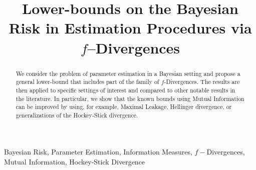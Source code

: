 \documentclass[conference]{IEEEtran}
\theoremstyle{plain}
\theoremstyle{definition}
\theoremstyle{remark}
\begin{document}
\title{Lower-bounds on the Bayesian Risk in Estimation Procedures via $f$--Divergences}


\author{
}

\maketitle

\begin{abstract}
  We consider the problem of parameter estimation in a Bayesian setting and propose a general lower-bound that includes part of the family of $f$-Divergences. The results are then applied to specific settings of interest and compared to other notable results in the literature. In particular, %
  we show that the known bounds using Mutual Information can be improved by using, for example, Maximal Leakage, Hellinger divergence, or generalizations of the Hockey-Stick divergence.
  
\end{abstract}

\begin{IEEEkeywords}
Bayesian Risk, Parameter Estimation, Information Measures, $f-$Divergences, Mutual Information, Hockey-Stick Divergence
\end{IEEEkeywords}
\end{document}
